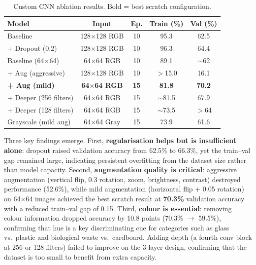 \documentclass[a4paper,11pt]{article}
\begin{document}
\begin{table}[ht]
    \centering
    \begin{tabular}{|l|c|c|c|c|}
    \hline
    \textbf{Model} & \textbf{Input} & \textbf{Ep.}
      & \textbf{Train (\%)} & \textbf{Val (\%)} \\ \hline
    Baseline                   & 128$\times$128 RGB  & 10 & 95.3  & 62.5  \\ \hline
    + Dropout (0.2)            & 128$\times$128 RGB  & 10 & 96.3  & 64.4  \\ \hline
    Baseline (64$\times$64)    & 64$\times$64 RGB    & 10 & 89.1  & $\sim$62 \\ \hline
    + Aug (aggressive)         & 128$\times$128 RGB  & 10 & $>$15.0 & 16.1 \\ \hline
    \textbf{+ Aug (mild)}      & \textbf{64$\times$64 RGB} & \textbf{15} & \textbf{81.8} & \textbf{70.2} \\ \hline
    + Deeper (256 filters)     & 64$\times$64 RGB    & 15 & $\sim$81.5 & 67.9 \\ \hline
    + Deeper (128 filters)     & 64$\times$64 RGB    & 15 & $\sim$73.5 & $>$64 \\ \hline
    Grayscale (mild aug)       & 64$\times$64 Gray   & 15 & 73.9  & 61.6  \\ \hline
    \end{tabular}
    \caption{Custom CNN ablation results. Bold = best scratch configuration.}
    \label{tab:cnn_scratch}
\end{table}
 
Three key findings emerge. First, \textbf{regularisation helps but is insufficient alone}: dropout raised validation accuracy from 62.5\% to 66.3\%, yet the train--val gap remained large, indicating persistent overfitting from the dataset size rather than model capacity. Second, \textbf{augmentation quality is critical}: aggressive augmentation (vertical flip, 0.3 rotation, zoom, brightness, contrast) destroyed performance (52.6\%), while mild augmentation (horizontal flip + 0.05 rotation) on 64$\times$64 images achieved the best scratch result at \textbf{70.3\%} validation accuracy with a reduced train--val gap of 0.15. Third, \textbf{colour is essential}: removing colour information dropped accuracy by 10.8 points (70.3\% $\to$ 59.5\%), confirming that hue is a key discriminating cue for categories such as glass vs.\ plastic and biological waste vs.\ cardboard. Adding depth (a fourth conv block at 256 or 128 filters) failed to improve on the 3-layer design, confirming that the dataset is too small to benefit from extra capacity.
\end{document}
